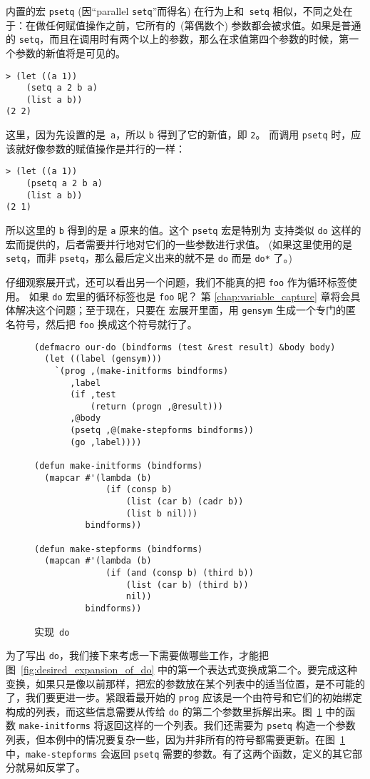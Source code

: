 内置的宏 \verb|psetq|\label{desc:psetq} (因“parallel \verb|setq|”而得名) 在行为上和~\verb|setq| 相似，不同之处在于：在做任何赋值操作之前，它所有的~(第偶数个) 参数都会被求值。如果是普通的 \verb|setq|，而且在调用时有两个以上的参数，那么在求值第四个参数的时候，第一个参数的新值将是可见的。
\begin{lstlisting}
> (let ((a 1))
    (setq a 2 b a)
    (list a b))
(2 2)
\end{lstlisting}
这里，因为先设置的是~\verb|a|，所以 \verb|b| 得到了它的新值，即 \verb|2|。
而调用 \verb|psetq| 时，应该就好像参数的赋值操作是并行的一样：
\begin{lstlisting}
> (let ((a 1))
    (psetq a 2 b a)
    (list a b))
(2 1)
\end{lstlisting}
所以这里的 \verb|b| 得到的是 \verb|a| 原来的值。这个 \verb|psetq| 宏是特别为
支持类似 \verb|do| 这样的宏而提供的，后者需要并行地对它们的一些参数进行求值。
(如果这里使用的是 \verb|setq|，而非 \verb|psetq|，那么最后定义出来的就不是
 \verb|do| 而是 \verb|do*| 了。)

仔细观察展开式，还可以看出另一个问题，我们不能真的把 \verb|foo| 作为循环标签使用。
如果 \verb|do| 宏里的循环标签也是 \verb|foo| 呢？
第 \ref{chap:variable_capture} 章将会具体解决这个问题；至于现在，只要在
宏展开里面，用 \verb|gensym| 生成一个专门的匿名符号，然后把 \verb|foo| 换成这个符号就行了。

\begin{figure}
\begin{lstlisting}
(defmacro our-do (bindforms (test &rest result) &body body)
  (let ((label (gensym)))
    `(prog ,(make-initforms bindforms)
       ,label
       (if ,test
           (return (progn ,@result)))
       ,@body
       (psetq ,@(make-stepforms bindforms))
       (go ,label))))

(defun make-initforms (bindforms)
  (mapcar #'(lambda (b)
              (if (consp b)
                  (list (car b) (cadr b))
                  (list b nil)))
          bindforms))

(defun make-stepforms (bindforms)
  (mapcan #'(lambda (b)
              (if (and (consp b) (third b))
                  (list (car b) (third b))
                  nil))
          bindforms))
\end{lstlisting}
\caption{\label{fig:implementing_do}实现~\texttt{do}}
\end{figure}

为了写出 \verb|do|，我们接下来考虑一下需要做哪些工作，才能把图~\ref{fig:desired_expansion_of_do} 中的第一个表达式变换成第二个。要完成这种变换，如果只是像以前那样，把宏的参数放在某个\bq{}列表中的适当位置，是不可能的了，我们要更进一步。紧跟着最开始的 \verb|prog| 应该是一个由符号和它们的初始绑定构成的列表，而这些信息需要从传给 \verb|do| 的第二个参数里拆解出来。图~\ref{fig:implementing_do} 中的函数 \verb|make-initforms| 将返回这样的一个列表。我们还需要为 \verb|psetq| 构造一个参数列表，但本例中的情况要复杂一些，因为并非所有的符号都需要更新。在图~\ref{fig:implementing_do} 中，\verb|make-stepforms| 会返回 \verb|psetq| 需要的参数。有了这两个函数，定义的其它部分就易如反掌了。

